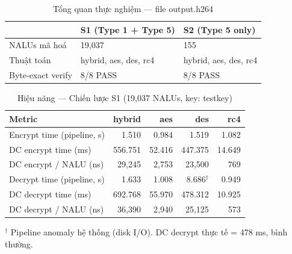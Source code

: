 
\begin{table}[ht]
\centering
\caption{Tổng quan thực nghiệm — file output.h264}
\label{tab:overview}
\begin{tabular}{|l|l|l|}
\hline
 & \textbf{S1 (Type 1 + Type 5)} & \textbf{S2 (Type 5 only)} \\
\hline
NALUs mã hoá       & 19{,}037 & 155 \\
\hline
Thuật toán         & hybrid, aes, des, rc4 & hybrid, aes, des, rc4 \\
\hline
Byte-exact verify  & 8/8 PASS & 8/8 PASS \\
\hline
\end{tabular}
\end{table}

\begin{table}[ht]
\centering
\caption{Hiệu năng — Chiến lược S1 (19{,}037 NALUs, key: testkey)}
\label{tab:perf_s1}
\begin{tabular}{|l|r|r|r|r|}
\hline
\textbf{Metric} & \textbf{hybrid} & \textbf{aes} & \textbf{des} & \textbf{rc4} \\
\hline
Encrypt time (pipeline, s)  & 1.510 & 0.984 & 1.519 & 1.082 \\
\hline
DC encrypt time (ms)        & 556.751 & 52.416 & 447.375 & 14.649 \\
\hline
DC encrypt / NALU (ns)      & 29{,}245 & 2{,}753 & 23{,}500 & 769 \\
\hline
Decrypt time (pipeline, s)  & 1.633 & 1.008 & 8.686$^\dagger$ & 0.949 \\
\hline
DC decrypt time (ms)        & 692.768 & 55.970 & 478.312 & 10.925 \\
\hline
DC decrypt / NALU (ns)      & 36{,}390 & 2{,}940 & 25{,}125 & 573 \\
\hline
\end{tabular}
\begin{tablenotes}
\small
\item $^\dagger$ Pipeline anomaly hệ thống (disk I/O). DC decrypt thực tế = 478 ms, bình thường.
\end{tablenotes}
\end{table}

